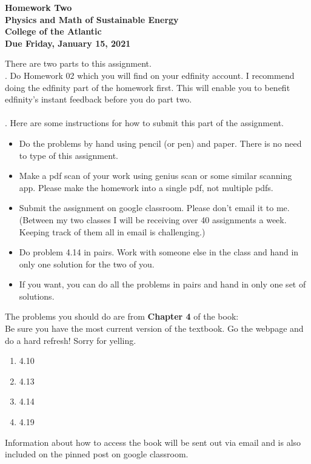 \documentclass[12pt]{article}
\begin{document}
\pagestyle{empty}
 
\begin{center}
{\LARGE {\bf Homework Two}}\\
\bigskip
{\Large {\bf Physics and Math of Sustainable Energy}}\\
\bigskip
{\Large {\bf College of the Atlantic}}\\
\bigskip
{ {\bf Due Friday, January 15, 2021}}\\ 
\end{center}
\medskip


\noindent There are two parts to this assignment.\\

.  Do Homework 02 which you will find
on your edfinity account.  I recommend doing the edfinity part of the
homework first.  This will enable you to benefit edfinity's instant
feedback before you do part two.\\

\hspace{2mm}\\

.  Here are some
instructions for how to submit this part of the assignment.
\begin{itemize}
\item Do the problems by hand using pencil (or pen) and paper.
  There is no need to type of this assignment.
\item Make a pdf scan of your work using genius scan or some
  similar scanning app.  Please make the homework into a single
  pdf, not multiple pdfs.
\item Submit the assignment on google classroom.  Please don't
  email it to me.  (Between my two classes I will be receiving
  over 40 assignments a week.  Keeping track of them all in email
  is challenging.)
\item Do problem 4.14 in pairs. Work with someone else in the class
  and hand in only one solution for the two of you.
\item If you want, you can do all the problems in pairs and hand
  in only one set of solutions.\\
\end{itemize}

\noindent The problems you should do are from {\bf Chapter 4} of the book: \\

  Be sure you have the most current version
of the textbook.  Go the webpage and do a hard refresh!  Sorry for
yelling.\\ 


\begin{enumerate}
\setlength{\itemsep}{-1mm}
\item 4.10
\item 4.13
\item 4.14
\item 4.19\\
\end{enumerate}

\noindent Information about how to access the book will be sent out
via email and is also included on the pinned post on google
classroom. 
\end{document}
